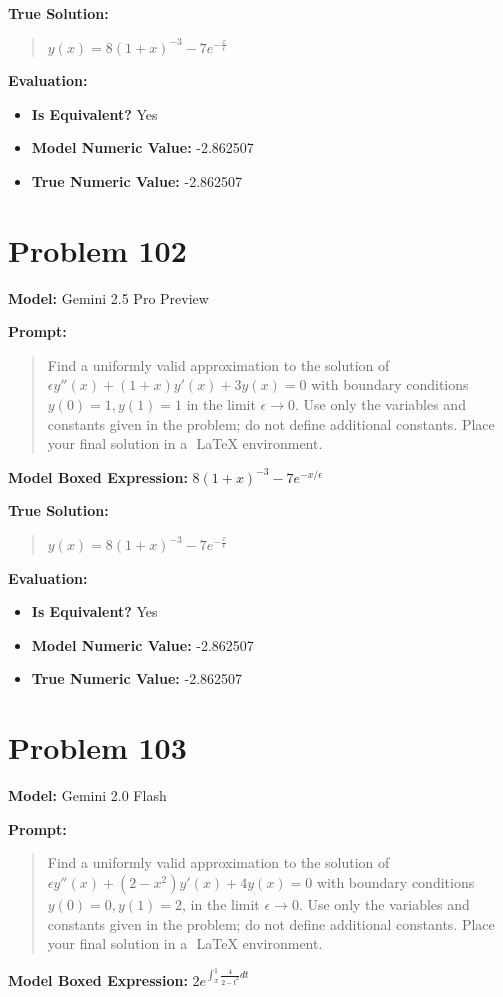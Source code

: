 \documentclass{article}
\begin{document}
{\textbf{True Solution:}
\begin{quote}
$y(x)=8(1+x)^{-3}-7e^{-\frac{x}{\epsilon}}$
\end{quote}

\textbf{Evaluation:}
\begin{itemize}
\item \textbf{Is Equivalent?} Yes
\item \textbf{Model Numeric Value:} -2.862507
\item \textbf{True Numeric Value:} -2.862507
\end{itemize}
\vspace{1cm}
\section*{Problem 102}
\textbf{Model:} Gemini 2.5 Pro Preview

\textbf{Prompt:}
\begin{quote}
Find a uniformly valid approximation to the solution of $\epsilon y''(x) + (1 + x) y'(x) + 3 y(x) = 0$ with boundary conditions $y(0) = 1, y(1) = 1$ in the limit $\epsilon \to 0$. Use only the variables and constants given in the problem; do not define additional constants. Place your final solution in a $\boxed{}$ LaTeX environment.
\end{quote}
\textbf{Model Boxed Expression:} $8(1+x)^{-3} - 7e^{-x/\epsilon}$

\textbf{True Solution:}
\begin{quote}
$y(x)=8(1+x)^{-3}-7e^{-\frac{x}{\epsilon}}$
\end{quote}

\textbf{Evaluation:}
\begin{itemize}
\item \textbf{Is Equivalent?} Yes
\item \textbf{Model Numeric Value:} -2.862507
\item \textbf{True Numeric Value:} -2.862507
\end{itemize}
\vspace{1cm}
\section*{Problem 103}
\textbf{Model:} Gemini 2.0 Flash

\textbf{Prompt:}
\begin{quote}
Find a uniformly valid approximation to the solution of $\epsilon y''(x) + (2 - x^2) y'(x) + 4 y(x) = 0$ with boundary conditions $y(0) = 0, y(1) = 2$, in the limit $\epsilon \to 0$. Use only the variables and constants given in the problem; do not define additional constants. Place your final solution in a $\boxed{}$ LaTeX environment.
\end{quote}
\textbf{Model Boxed Expression:} $2 e^{\int_x^1 \frac{4}{2-t^2} dt}$

}
\end{document}

